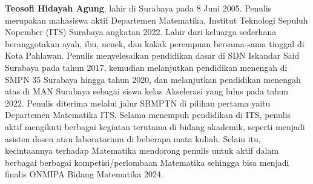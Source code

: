 \documentclass{file/KP-ITS}
\theoremstyle{definition}
\theoremstyle{definition}
\theoremstyle{plain}
\begin{document}
\cleardoublepage
{}
\textbf{Teosofi Hidayah Agung}, lahir di Surabaya pada 8 Juni 2005. Penulis merupakan mahasiswa aktif Departemen Matematika, Institut Teknologi Sepuluh Nopember (ITS) Surabaya angkatan 2022. Lahir dari keluarga sederhana beranggotakan ayah, ibu, nenek, dan kakak perempuan bersama-sama tinggal di Kota Pahlawan. Penulis menyelesaikan pendidikan dasar di SDN Iskandar Said Surabaya pada tahun 2017, kemudian melanjutkan pendidikan menengah di SMPN 35 Surabaya hingga tahun 2020, dan melanjutkan pendidikan menengah atas di MAN Surabaya sebagai siswa kelas Akselerasi yang lulus pada tahun 2022. Penulis diterima melalui jalur SBMPTN di pilihan pertama yaitu Departemen Matematika ITS. Selama menempuh pendidikan di ITS, penulis aktif mengikuti berbagai kegiatan terutama di bidang akademik, seperti menjadi asisten dosen atau laboratorium di beberapa mata kuliah. Selain itu, kecintaannya terhadap Matematika mendorong penulis untuk aktif dalam berbagai berbagai kompetisi/perlombaan Matematika sehingga bisa menjadi finalis ONMIPA Bidang Matematika 2024.
\end{document}
